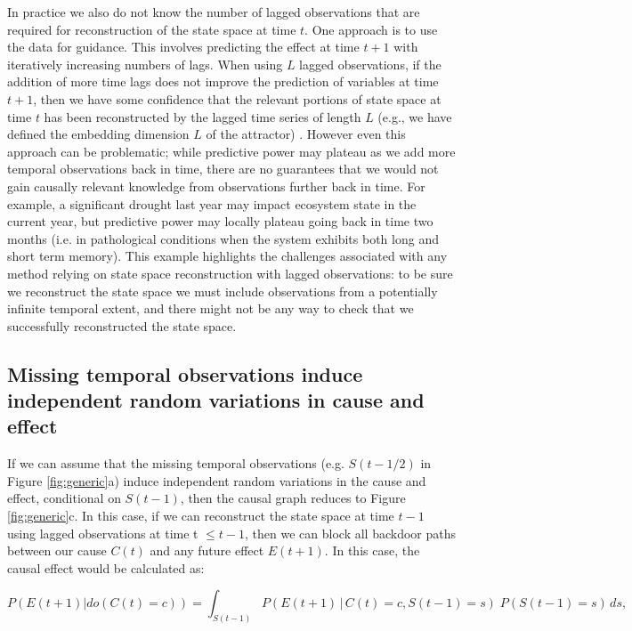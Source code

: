 \documentclass[12pt]{article}
\begin{document}
In practice we also do not know the number of lagged observations that
are required for reconstruction of the state space at time $t$. One
approach is to use the data for guidance. This involves predicting the
effect at time $t+1$ with iteratively increasing numbers of lags. When
using $L$ lagged observations, if the addition of more time lags does
not improve the prediction of variables at time $t+1$, then we have
some confidence that the relevant portions of state space at time $t$
has been reconstructed by the lagged time series of length $L$ (e.g.,
we have defined the embedding dimension $L$ of the attractor)
\citep{Sugihara496}. However even this approach can be problematic;
while predictive power may plateau as we add more temporal
observations back in time, there are no guarantees that we would not
gain causally relevant knowledge from observations further back in
time. For example, a significant drought last year may impact
ecosystem state in the current year, but predictive power may locally
plateau going back in time two months (i.e. in pathological conditions
when the system exhibits both long and short term memory). This
example highlights the challenges associated with any method relying
on state space reconstruction with lagged observations: to be sure we
reconstruct the state space we must include observations from a
potentially infinite temporal extent, and there might not be any way
to check that we successfully reconstructed the state space.

\subsection{Missing temporal observations induce independent random
  variations in cause and effect}
\label{sec:miss-temp-observ}

If we can assume that the missing temporal observations
(e.g. $S(t-1/2)$ in Figure \ref{fig:generic}a) induce independent
random variations in the cause and effect, conditional on $S(t-1)$,
then the causal graph reduces to Figure \ref{fig:generic}c. In this
case, if we can reconstruct the state space at time $t-1$ using lagged
observations at time t $\leq t-1$, then we can block all backdoor
paths between our cause $C(t)$ and any future effect $E(t+1)$. In this
case, the causal effect would be calculated as:

\begin{equation}
  P(E(t+1)| do(C(t)=c)) = \int_{S(t-1)} P(E(t+1) \, | \, C(t)=c,
  S(t-1) = s
  )\; P(S(t-1)=s) \, d s,
\end{equation}
\end{document}
